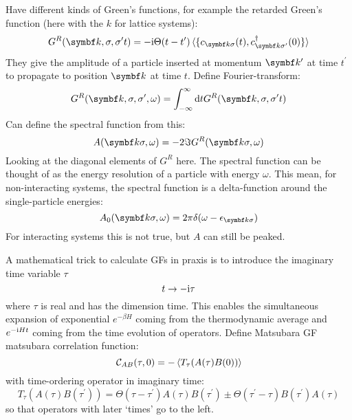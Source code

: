 \documentclass[../notes.tex]{subfiles}
\begin{document}
Have different kinds of Green's functions, for example the retarded Green's function (here with the \(k\) for lattice systems):
\begin{equation}
	G^R (\vb{k}, \sigma, \sigma^{\prime} t) = -\iu \Theta(t- t^{\prime}) \braket{ \{c_{\vb{k} \sigma} (t), c_{\vb{k} \sigma^{\prime}}^{\dagger} (0)\}}
\end{equation}
They give the amplitude of a particle inserted at momentum \(\vb{k}^{\prime}\) at time \(t^{\prime}\) to propagate to position \(\vb{k}\) at time \(t\).
Define Fourier-transform:
\begin{equation}
	G^R (\vb{k}, \sigma, \sigma^{\prime}, \omega) = \int_{-\infty}^{\infty} \odif{t} G^R (\vb{k}, \sigma, \sigma^{\prime} t)
\end{equation}
Can define the spectral function from this:
\begin{equation}
	A(\vb{k} \sigma, \omega) = -2 \Im G^R (\vb{k} \sigma, \omega)
\end{equation}
Looking at the diagonal elements of \(G^R\) here.
The spectral function can be thought of as the energy resolution of a particle with energy \(\omega\).
This mean, for non-interacting systems, the spectral function is a delta-function around the single-particle energies:
\begin{equation}
	A_0 (\vb{k} \sigma, \omega) = 2\pi \delta (\omega - \epsilon_{\vb{k} \sigma})
\end{equation}
For interacting systems this is not true, but \(A\) can still be peaked.


A mathematical trick to calculate GFs in praxis is to introduce the imaginary time variable \(\tau\)
\begin{equation}
	t \to -\mathrm{i} \tau
\end{equation}
where \(\tau\) is real and has the dimension time.
This enables the simultaneous expansion of exponential \(e^{-\beta H}\) coming from the thermodynamic average and \(e^{-\mathrm{i} H t}\) coming from the time evolution of operators.
Define Matsubara GF \gls{matsubara correlation function}:
\begin{equation}
	\mathcal{C}_{A B} (\tau, 0) = - \Braket{T_{\tau} (A(\tau) B(0))}
\end{equation}
with time-ordering operator in imaginary time:
\begin{equation}
	T_{\tau} (A(\tau) B(\tau^{\prime})) = \Theta(\tau - \tau^{\prime}) A(\tau) B(\tau^{\prime}) \pm \Theta(\tau^{\prime} - \tau) B(\tau^{\prime}) A(\tau)
\end{equation}
so that operators with later `times' go to the left.
\end{document}
